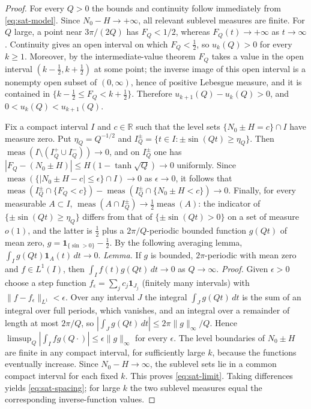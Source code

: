 \documentclass[11pt,a4paper]{article}
\numberwithin{equation}{section}
\theoremstyle{definition}
\theoremstyle{remark}
\newcommand{\meas}{\operatorname{meas}}
\newcommand{\ind}{\mathbf 1}
\begin{document}
\begin{proof}
For every $Q>0$ the bounds and continuity follow immediately from \eqref{eq:sat-model}. Since $N_0-H\to+\infty$, all relevant sublevel measures are finite. For $Q$ large, a point near $3\pi/(2Q)$ has $F_Q<1/2$, whereas $F_Q(t)\to+\infty$ as $t\to\infty$. Continuity gives an open interval on which $F_Q<\frac12$, so $u_k(Q)>0$ for every $k\ge1$. Moreover, by the intermediate-value theorem $F_Q$ takes a value in the open interval $(k-\frac12,k+\frac12)$ at some point; the inverse image of this open interval is a nonempty open subset of $(0,\infty)$, hence of positive Lebesgue measure, and it is contained in $\{k-\frac12\le F_Q<k+\frac12\}$. Therefore $u_{k+1}(Q)-u_k(Q)>0$, and $0<u_k(Q)<u_{k+1}(Q)$.

Fix a compact interval $I$ and $c\in\mathbb R$ such that the level sets $\{N_0\pm H=c\}\cap I$ have measure zero. Put $\eta_Q=Q^{-1/2}$ and $I_Q^\pm=\{t\in I:\pm\sin(Qt)\ge\eta_Q\}$. Then $\meas(I\setminus(I_Q^+\cup I_Q^-))\to0$, and on $I_Q^\pm$ one has $|F_Q-(N_0\pm H)|\le H(1-\tanh\sqrt Q)\to0$ uniformly. Since $\meas(\{|N_0\pm H-c|\le\epsilon\}\cap I)\to0$ as $\epsilon\to0$, it follows that $\meas(I_Q^\pm\cap\{F_Q<c\})-\meas(I_Q^\pm\cap\{N_0\pm H<c\})\to0$. Finally, for every measurable $A\subset I$, $\meas(A\cap I_Q^\pm)\to\frac12\meas(A)$: the indicator of $\{\pm\sin(Qt)\ge\eta_Q\}$ differs from that of $\{\pm\sin(Qt)>0\}$ on a set of measure $o(1)$, and the latter is $\frac12$ plus a $2\pi/Q$-periodic bounded function $g(Qt)$ of mean zero, $g=\ind_{\{\sin>0\}}-\frac12$. By the following averaging lemma, $\int_Ig(Qt)\ind_A(t)\,dt\to0$. \emph{Lemma.} If $g$ is bounded, $2\pi$-periodic with mean zero and $f\in L^1(I)$, then $\int_If(t)g(Qt)\,dt\to0$ as $Q\to\infty$. \emph{Proof.} Given $\epsilon>0$ choose a step function $f_\epsilon=\sum_jc_j\ind_{J_j}$ (finitely many intervals) with $\|f-f_\epsilon\|_{L^1}<\epsilon$. Over any interval $J$ the integral $\int_Jg(Qt)\,dt$ is the sum of an integral over full periods, which vanishes, and an integral over a remainder of length at most $2\pi/Q$, so $|\int_Jg(Qt)\,dt|\le2\pi\|g\|_\infty/Q$. Hence $\limsup_Q|\int_Ifg(Q\cdot)|\le\epsilon\|g\|_\infty$ for every $\epsilon$. The level boundaries of $N_0\pm H$ are finite in any compact interval, for sufficiently large $k$, because the functions eventually increase. Since $N_0-H\to\infty$, the sublevel sets lie in a common compact interval for each fixed $k$. This proves \eqref{eq:sat-limit}. Taking differences yields \eqref{eq:sat-spacing}; for large $k$ the two sublevel measures equal the corresponding inverse-function values.
\end{proof}
\end{document}
